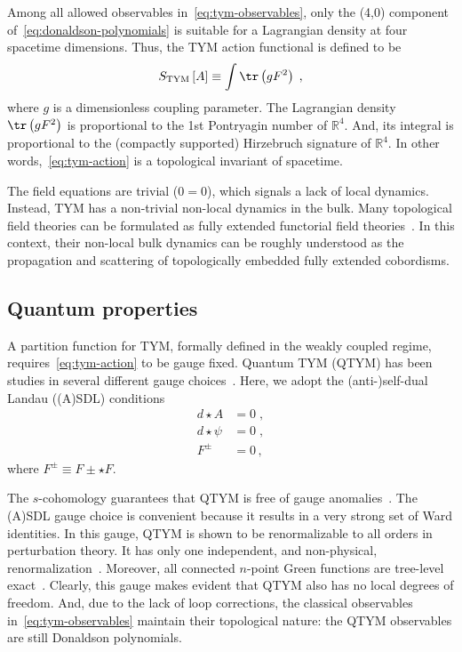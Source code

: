 \documentclass[../main/tex]{subfiles}
\begin{document}
Among all allowed observables in~\eqref{eq:tym-observables}, only the (4,0) component of~\eqref{eq:donaldson-polynomials} is suitable for a Lagrangian density at four spacetime dimensions. Thus, the TYM action functional is defined to be
\begin{equation}\label{eq:tym-action}
  S_{\text{TYM}}\left[ A \right] \equiv  \int\tr\left( g F^2\right) \;,
\end{equation}
where $ g $ is a dimensionless coupling parameter. The Lagrangian density $\tr \left(g F^2 \right)$ is proportional to the 1st Pontryagin number of $\mathbb{R}^4$. And, its integral is proportional to the (compactly supported) Hirzebruch signature of $\mathbb{R}^4$. In other words,~\eqref{eq:tym-action} is a topological  invariant of spacetime.

The field equations are trivial ($0=0$), which signals a lack of local dynamics. Instead, TYM has a non-trivial non-local dynamics in the bulk. Many topological field theories can be formulated as fully extended functorial field theories~\cite{atiyah1988a,segal1988a,baez1995a,schreiber2009a,baez2009a}. In this context, their non-local bulk dynamics can be roughly understood as the propagation and scattering of topologically embedded fully extended cobordisms.

\subsection{Quantum properties}\label{ssec:quantum-properties;sec:tym}

A partition function for TYM, formally defined in the weakly coupled regime, requires~\eqref{eq:tym-action} to be gauge fixed. Quantum TYM (QTYM) has been studies in several different gauge choices~\cite{baulieu1988a,myers1990c,brandhuber1994a,piguet1995a,sadovski2017c,sadovski2018a,sadovski2018b}. Here, we adopt the (anti-){}self-dual Landau ((A){}SDL) conditions
\begin{subequations}\label{eq:asdlg}
  \begin{align}
    d \star A    & = 0 \;, \\
    d \star \psi & = 0 \;, \\
    F^{\pm}      & = 0 \,,
  \end{align}
\end{subequations}
where $ F^{\pm} \equiv F \pm \star F $.

The $ s $-cohomology guarantees that QTYM is free of gauge anomalies~\cite{baulieu1988a}. The (A){}SDL gauge choice is convenient because it results in a very strong set of Ward identities. In this gauge, QTYM is shown to be renormalizable to all orders in perturbation theory. It has only one independent, and non-physical, renormalization~\cite{sadovski2017c}. Moreover, all connected $n$-point Green functions are tree-level exact~\cite{sadovski2018a}. Clearly, this gauge makes evident that QTYM also has no local degrees of freedom. And, due to the lack of loop corrections, the classical observables in~\eqref{eq:tym-observables} maintain their topological nature: the QTYM observables are still Donaldson polynomials.
\end{document}
